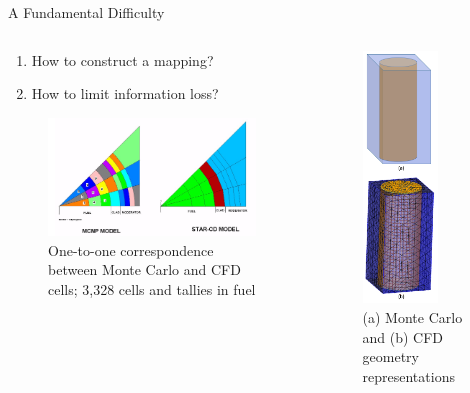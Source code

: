 \documentclass[10pt]{beamer}
\begin{document}
\begin{frame}{A Fundamental Difficulty}

\begin{columns}
\begin{column}{0.575\linewidth}
\vspace{0.8cm}
\begin{enumerate}
\item How to construct a mapping?\newline
\item How to limit information loss?
\end{enumerate}
\vspace{1.2cm}
\begin{figure}
\includegraphics[width=5.5cm]{../Figures/MCNP_STARCD_meshes.png}
\caption{One-to-one correspondence between Monte Carlo and CFD cells; 3,328 cells and tallies in fuel \cite{cardoni}}
\end{figure}

\end{column}
\begin{column}{0.4\linewidth}
\begin{figure}
\includegraphics[width=2cm]{../Figures/MC_vs_CFD_mesh.png}
\caption{(a) Monte Carlo and (b) CFD geometry representations}
\end{figure}
\end{column}
\end{columns}

\end{frame}
\end{document}

